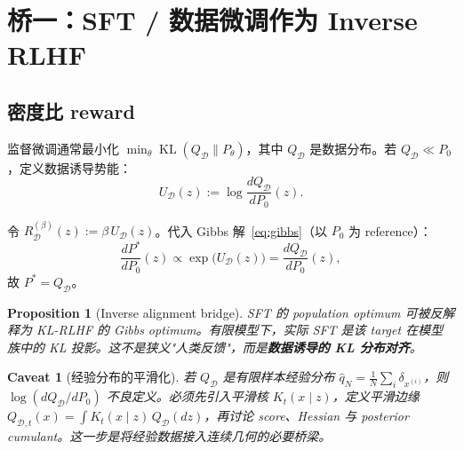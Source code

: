 \documentclass[11pt,a4paper]{article}
\newtheorem{proposition}[theorem]{Proposition}
\newtheorem{caveat}[theorem]{Caveat}
\DeclareMathOperator{\KL}{KL}
\newcommand{\cD}{\mathcal{D}}
\begin{document}
\section{桥一：SFT / 数据微调作为 Inverse RLHF}
\label{sec:inverse_rlhf}

\subsection{密度比 reward}

监督微调通常最小化 $\min_\theta \KL(Q_\cD \| P_\theta)$，其中 $Q_\cD$ 是数据分布。若 $Q_\cD \ll P_0$，定义数据诱导势能：
\begin{equation}\label{eq:data_potential}
U_\cD(z) := \log\frac{dQ_\cD}{dP_0}(z).
\end{equation}

令 $R_\cD^{(\beta)}(z) := \beta\,U_\cD(z)$。代入 Gibbs 解~\eqref{eq:gibbs}（以 $P_0$ 为 reference）：
\[
\frac{dP^*}{dP_0}(z) \propto \exp\!\bigl(U_\cD(z)\bigr) = \frac{dQ_\cD}{dP_0}(z),
\]
故 $P^* = Q_\cD$。

\begin{proposition}[Inverse alignment bridge]\label{prop:inverse}
SFT 的 population optimum 可被反解释为 KL-RLHF 的 Gibbs optimum。有限模型下，实际 SFT 是该 target 在模型族中的 KL 投影。这不是狭义"人类反馈"，而是\textbf{数据诱导的 KL 分布对齐}。
\end{proposition}

\begin{caveat}[经验分布的平滑化]\label{cav:smoothing}
若 $Q_\cD$ 是有限样本经验分布 $\widehat{q}_N = \frac{1}{N}\sum_i \delta_{x^{(i)}}$，则 $\log(dQ_\cD/dP_0)$ 不良定义。必须先引入平滑核 $K_t(x\mid z)$，定义平滑边缘 $Q_{\cD,t}(x) = \int K_t(x\mid z)\,Q_\cD(dz)$，再讨论 score、Hessian 与 posterior cumulant。这一步是将经验数据接入连续几何的必要桥梁。
\end{caveat}
\end{document}
